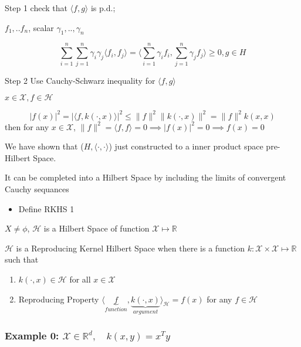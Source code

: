 \documentclass[10pt,portrait]{article}
\providecommand{\tightlist}{%
  \setlength{\itemsep}{0pt}\setlength{\parskip}{0pt}}
\begin{document}
Step 1 check that \(\langle f,g\rangle\) is p.d.;

\(f_1,..f_n\), scalar \(\gamma_1,..,\gamma_n\)

\[\sum_{i=1}^n\sum_{j=1}^n\gamma_i\gamma_j\langle f_i,f_j\rangle=\langle\sum_{i=1}^n\gamma_i f_i,\sum_{j=1}^n\gamma_jf_j\rangle\ge0, g\in H\]

Step 2 Use Cauchy-Schwarz inequality for \(\langle f,g\rangle\)

\(x\in\mathcal{X},f\in\mathcal{H}\)

\[|f(x)|^2=|\langle f,k(\cdot,x)\rangle|^2\le\|f\|^2\|k(\cdot,x)\|^2=\|f\|^2k(x,x)\]
then for any \(x\in\mathcal{X}\),
\(\|f\|^2=\langle f,f\rangle=0\implies|f(x)|^2=0\implies f(x)=0\)

We have shown that (\(H,\langle\cdot,\cdot\rangle\)) just constructed to
a inner product space pre-Hilbert Space.

It can be completed into a Hilbert Space by including the limits of
convergent Cauchy sequances

\begin{itemize}
\tightlist
\item
  Define RKHS 1
\end{itemize}

\(X\neq\phi\), \(\mathcal{H}\) is a Hilbert Space of function
\(\mathcal{X}\mapsto\mathbb{R}\)

\(\mathcal{H}\) is a Reproducing Kernel Hilbert Space when there is a
function \(k: \mathcal{X}\times\mathcal{X}\mapsto\mathbb{R}\) such that

\begin{enumerate}
\def\labelenumi{\arabic{enumi}.}
\item
  \(k(\cdot,x)\in{\mathcal{H}}\) for all \(x\in\mathcal{X}\)
\item
  Reproducing Property
  \(\langle\underbrace{ f}_{function},\underbrace{k(\cdot,x)}_{argument}\rangle_{\mathcal{H}}=f(x)\)
  for any \(f\in\mathcal{H}\)
\end{enumerate}

\hypertarget{example-0-mathcalxinmathbbrdquad-kxyxty}{%
\subsubsection{\texorpdfstring{Example 0:
\(\mathcal{X}\in\mathbb{R}^d,\quad k(x,y)=x^Ty\)}{Example 0: \textbackslash{}mathcal\{X\}\textbackslash{}in\textbackslash{}mathbb\{R\}\^{}d,\textbackslash{}quad k(x,y)=x\^{}Ty}}\label{example-0-mathcalxinmathbbrdquad-kxyxty}}
\end{document}
